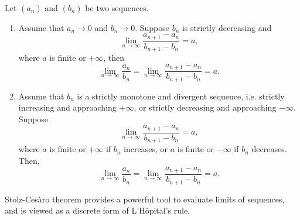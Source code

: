 \begin{theorem}
  Let $(a_n)$ and $(b_n)$ be two sequences.
  \begin{enumerate}
    \item Assume that $a_n \to 0$ and $b_n \to 0$. Suppose $b_n$ is
      strictly decreasing and
      \[ \lim_{n \to \infty} \frac{a_{n + 1} - a_n}{b_{n + 1} - b_n} = a, \]
      where $a$ is finite or $+\infty$, then
      \[ \lim_{n \to \infty} \frac{a_n}{b_n} = \lim_{n \to \infty}
      \frac{a_{n + 1} - a_n}{b_{n + 1} - b_n} = a. \]
    \item Assume that $b_n$ is a strictly monotone and divergent
      sequence, i.e. strictly increasing and approaching $+\infty$,
      or strictly decreasing and approaching $-\infty$. Suppose
      \[ \lim_{n \to \infty} \frac{a_{n + 1} - a_n}{b_{n + 1} - b_n} = a, \]
      where $a$ is finite or $+\infty$ if $b_n$ increases, or $a$ is finite
      or $-\infty$ if $b_n$ decreases. Then,
      \[ \lim_{n \to \infty} \frac{a_n}{b_n} = \lim_{n \to \infty}
      \frac{a_{n + 1} - a_n}{b_{n + 1} - b_n} = a. \]
  \end{enumerate}
\end{theorem}

\begin{remark}
  Stolz-Cesàro theorem provides a powerful tool to evaluate limits of
  sequences, and is
  viewed as a discrete form of L'Hôpital's rule.
\end{remark}

